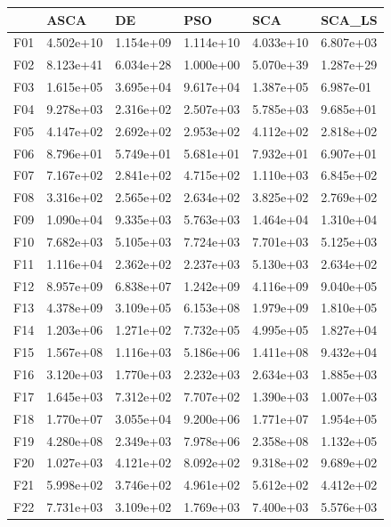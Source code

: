 \begin{tabular}{llllll}
\toprule
{} &       ASCA &         DE &        PSO &        SCA &     SCA\_LS \\
\midrule
F01  &  4.502e+10 &  1.154e+09 &  1.114e+10 &  4.033e+10 &  6.807e+03 \\
F02  &  8.123e+41 &  6.034e+28 &  1.000e+00 &  5.070e+39 &  1.287e+29 \\
F03  &  1.615e+05 &  3.695e+04 &  9.617e+04 &  1.387e+05 &  6.987e-01 \\
F04  &  9.278e+03 &  2.316e+02 &  2.507e+03 &  5.785e+03 &  9.685e+01 \\
F05  &  4.147e+02 &  2.692e+02 &  2.953e+02 &  4.112e+02 &  2.818e+02 \\
F06  &  8.796e+01 &  5.749e+01 &  5.681e+01 &  7.932e+01 &  6.907e+01 \\
F07  &  7.167e+02 &  2.841e+02 &  4.715e+02 &  1.110e+03 &  6.845e+02 \\
F08  &  3.316e+02 &  2.565e+02 &  2.634e+02 &  3.825e+02 &  2.769e+02 \\
F09  &  1.090e+04 &  9.335e+03 &  5.763e+03 &  1.464e+04 &  1.310e+04 \\
F10  &  7.682e+03 &  5.105e+03 &  7.724e+03 &  7.701e+03 &  5.125e+03 \\
F11  &  1.116e+04 &  2.362e+02 &  2.237e+03 &  5.130e+03 &  2.634e+02 \\
F12  &  8.957e+09 &  6.838e+07 &  1.242e+09 &  4.116e+09 &  9.040e+05 \\
F13  &  4.378e+09 &  3.109e+05 &  6.153e+08 &  1.979e+09 &  1.810e+05 \\
F14  &  1.203e+06 &  1.271e+02 &  7.732e+05 &  4.995e+05 &  1.827e+04 \\
F15  &  1.567e+08 &  1.116e+03 &  5.186e+06 &  1.411e+08 &  9.432e+04 \\
F16  &  3.120e+03 &  1.770e+03 &  2.232e+03 &  2.634e+03 &  1.885e+03 \\
F17  &  1.645e+03 &  7.312e+02 &  7.707e+02 &  1.390e+03 &  1.007e+03 \\
F18  &  1.770e+07 &  3.055e+04 &  9.200e+06 &  1.771e+07 &  1.954e+05 \\
F19  &  4.280e+08 &  2.349e+03 &  7.978e+06 &  2.358e+08 &  1.132e+05 \\
F20  &  1.027e+03 &  4.121e+02 &  8.092e+02 &  9.318e+02 &  9.689e+02 \\
F21  &  5.998e+02 &  3.746e+02 &  4.961e+02 &  5.612e+02 &  4.412e+02 \\
F22  &  7.731e+03 &  3.109e+02 &  1.769e+03 &  7.400e+03 &  5.576e+03 \\

\end{tabular}
